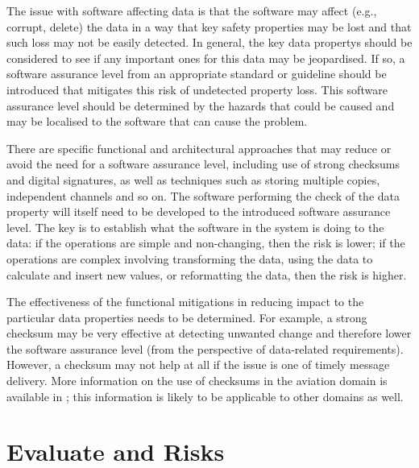 The issue with software affecting data is that the software may affect (e.g., corrupt, delete) the data in a way that key safety properties may be lost and that such loss may not be easily detected. In general, the key \glspl{data property} should be considered to see if any important ones for this data may be jeopardised. If so, a \gls{software assurance level} from an appropriate standard or guideline should be introduced that mitigates this risk of undetected property loss. This \gls{software assurance level} should be determined by the hazards that could be caused and may be localised to the software that can cause the problem.

There are specific functional and architectural approaches that may reduce or avoid the need for a \gls{software assurance level}, including use of strong checksums and digital signatures, as well as techniques such as storing multiple copies, independent channels and so on. The software performing the check of the \gls{data property} will itself need to be developed to the introduced \gls{software assurance level}. The key is to establish what the software in the system is doing to the data: if the operations are simple and non-changing, then the risk is lower; if the operations are complex involving transforming the data, using the data to calculate and insert new values, or reformatting the data, then the risk is higher.

The effectiveness of the functional \glspl{mitigation} in reducing impact to the particular data properties needs to be determined. For example, a strong checksum may be very effective at detecting unwanted change and therefore lower the \gls{software assurance level} (from the perspective of data-related requirements). However, a checksum may not help at all if the issue is one of timely message delivery. More \gls{information} on the use of checksums in the aviation domain is available in \cite{citation:koopman2015selection}; this \gls{information} is likely to be applicable to other domains as well.

\clearpage %
\section{Evaluate and  Risks}
\label{bkm:EvaluateAndTreat}
